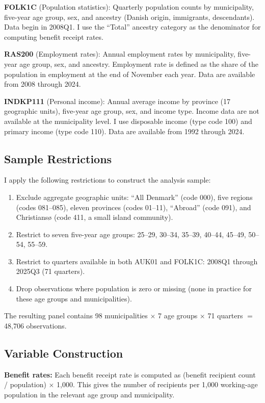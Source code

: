 \documentclass[12pt]{article}
\begin{document}
\textbf{FOLK1C} (Population statistics): Quarterly population counts by municipality, five-year age group, sex, and ancestry (Danish origin, immigrants, descendants). Data begin in 2008Q1. I use the ``Total'' ancestry category as the denominator for computing benefit receipt rates.

\textbf{RAS200} (Employment rates): Annual employment rates by municipality, five-year age group, sex, and ancestry. Employment rate is defined as the share of the population in employment at the end of November each year. Data are available from 2008 through 2024.

\textbf{INDKP111} (Personal income): Annual average income by province (17 geographic units), five-year age group, sex, and income type. Income data are not available at the municipality level. I use disposable income (type code 100) and primary income (type code 110). Data are available from 1992 through 2024.

\subsection{Sample Restrictions}

I apply the following restrictions to construct the analysis sample:
\begin{enumerate}
\item Exclude aggregate geographic units: ``All Denmark'' (code 000), five regions (codes 081--085), eleven provinces (codes 01--11), ``Abroad'' (code 091), and Christians\o{} (code 411, a small island community).
\item Restrict to seven five-year age groups: 25--29, 30--34, 35--39, 40--44, 45--49, 50--54, 55--59.
\item Restrict to quarters available in both AUK01 and FOLK1C: 2008Q1 through 2025Q3 (71 quarters).
\item Drop observations where population is zero or missing (none in practice for these age groups and municipalities).
\end{enumerate}

The resulting panel contains 98 municipalities $\times$ 7 age groups $\times$ 71 quarters $=$ 48,706 observations.

\subsection{Variable Construction}

\textbf{Benefit rates:} Each benefit receipt rate is computed as (benefit recipient count / population) $\times$ 1,000. This gives the number of recipients per 1,000 working-age population in the relevant age group and municipality.
\end{document}
